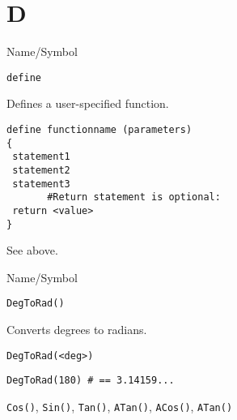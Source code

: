 \rl
\section{D}
\rl


\begin{desc}{Name/Symbol}
\item[Name/Symbol]  	\verb+define+

\item[Description]  	Defines a user-specified function.

\item[Usage]
\begin{verbatim}
define functionname (parameters)
{
 statement1
 statement2
 statement3
       #Return statement is optional:
 return <value>
}
\end{verbatim}

\item[Example]    	See above.

\item[See Also]
\end{desc}   	

\rl

\begin{desc}{Name/Symbol}
\item[Name/Symbol]  	\verb+DegToRad()+

\item[Description]  	Converts degrees to radians.

\item[Usage]
\begin{verbatim}
DegToRad(<deg>)
\end{verbatim}

\item[Example]     	
\begin{verbatim}
DegToRad(180) # == 3.14159...
\end{verbatim}

\item[See Also]    	\verb+Cos()+, \verb+Sin()+, \verb+Tan()+, \verb+ATan()+, \verb+ACos()+, \verb+ATan()+ 
\end{desc}

\rl



